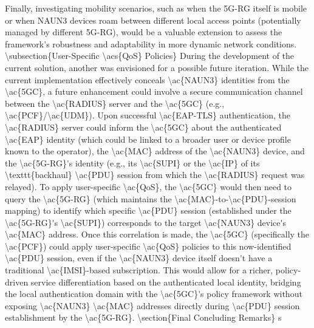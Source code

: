 Finally, investigating mobility scenarios, such as when the \ac{5G-RG} itself is mobile or when \ac{NAUN3} devices roam between different local access points (potentially managed by different \acp{5G-RG), would be a valuable extension to assess the framework's robustness and adaptability in more dynamic network conditions.

\subsection{User-Specific \acs{QoS} Policies}

During the development of the current solution, another was envisioned for a possible future iteration. While the current implementation effectively conceals \ac{NAUN3} identities from the \ac{5GC}, a future enhancement could involve a secure communication channel between the \ac{RADIUS} server and the \ac{5GC} (e.g., \ac{PCF}/\ac{UDM}). Upon successful \ac{EAP-TLS} authentication, the \ac{RADIUS} server could inform the \ac{5GC} about the authenticated \ac{EAP} identity (which could be linked to a broader user or device profile known to the operator), the \ac{MAC} address of the \ac{NAUN3} device, and the \ac{5G-RG}'s identity (e.g., its \ac{SUPI} or the \ac{IP} of its \texttt{backhaul} \ac{PDU} session from which the \ac{RADIUS} request was relayed). To apply user-specific \ac{QoS}, the \ac{5GC} would then need to query the \ac{5G-RG} (which maintains the \ac{MAC}-to-\ac{PDU}-session mapping) to identify which specific \ac{PDU} session (established under the \ac{5G-RG}'s \ac{SUPI}) corresponds to the target \ac{NAUN3} device's \ac{MAC} address. Once this correlation is made, the \ac{5GC} (specifically the \ac{PCF}) could apply user-specific \ac{QoS} policies to this now-identified \ac{PDU} session, even if the \ac{NAUN3} device itself doesn't have a traditional \ac{IMSI}-based subscription. This would allow for a richer, policy-driven service differentiation based on the authenticated local identity, bridging the local authentication domain with the \ac{5GC}'s policy framework without exposing \ac{NAUN3} \ac{MAC} addresses directly during \ac{PDU} session establishment by the \ac{5G-RG}.

\section{Final Concluding Remarks}

}
